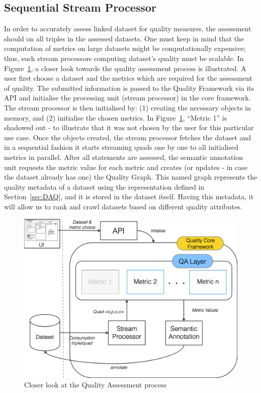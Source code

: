 
\subsection{Sequential Stream Processor}
\label{sec:StreamProcessor} 
In order to accurately assess linked dataset for quality measures, the assessment should on all triples in the assessed datasets.
One must keep in mind that the computation of metrics on large datasets might be computationally expensive; thus, such stream processors computing dataset's quality must be scalable.
In Figure~\ref{fig:closerLook}, a closer look towards the quality assessment process is illustrated.
A user first choose a dataset and the metrics which are required for the assessment of quality.
The submitted information is passed to the Quality Framework via its API and initialise the processing unit (stream processor) in the core framework.
The stream processor is then initialised by: (1) creating the necessary objects in memory, and (2) initialise the chosen metrics. 
In Figure~\ref{fig:closerLook}, ``Metric 1'' is shadowed out - to illustrate that it was not chosen by the user for this particular use case.
Once the objects created, the stream processor fetches the dataset and in a sequential fashion it starts streaming quads one by one to all initialised metrics in parallel.
After all statements are assessed, the semantic annotation unit requests the metric value for each metric and creates (or updates - in case the dataset already has one) the Quality Graph.
This named graph represents the quality metadata of a dataset using the representation defined in Section~\ref{sec:DAQ}, and it is stored in the dataset itself.
Having this metadata, it will allow us to rank and crawl datasets based on different quality attributes.

\begin{figure}[tbph]
\center
\includegraphics[scale=0.3]{images/closerLook.pdf} 
\caption{Closer look at the Quality Assessment process} 
\label{fig:closerLook}
\end{figure}

